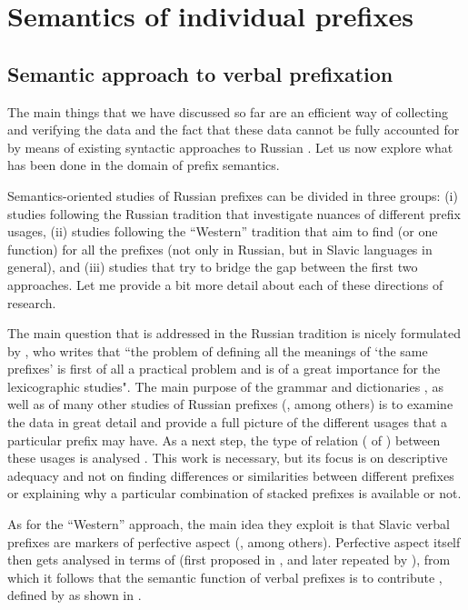 \chapter{Semantics of individual prefixes} %
\label{Chapter5}
\section{Semantic approach to verbal prefixation}
The main things that we have discussed so far are an efficient way of collecting and verifying the data and the fact that these data cannot be fully accounted for by means of existing syntactic approaches to Russian . Let us now explore what has been done in the domain of prefix semantics.

Semantics-oriented studies of Russian prefixes can be divided in three groups: (i) studies following the Russian tradition that investigate nuances of different prefix usages, (ii) studies following the ``Western'' tradition that aim to find  (or one function) for all the prefixes (not only in Russian, but in Slavic languages in general), and (iii) studies that try to bridge the gap between the first two approaches. Let me provide a bit more detail about each of these directions of research.

The main question that is addressed in the Russian tradition is nicely formulated by \citet[18]{Boguslawski:63}, who writes that ``the problem of defining all the meanings of `the same prefixes' is first of all a practical problem and is of a great importance for the lexicographic studies". The main purpose of the grammar \citep{Grammar:52, Shvedova:82} and dictionaries \citep{Dict:50, Dict:57}, as well as of many other studies of Russian prefixes (\citealt{Avilova:64, Golovin:59, Lopatin:97, Tixonov:98}, among others) is to examine the data in great detail and provide a full picture of the different usages that a particular prefix may have. As a next step, the type of relation ( of ) between these usages is analysed \citep{Krongauz:97, Plungyan:01}. This work is necessary, but its focus is on descriptive adequacy and not on finding differences or similarities between different prefixes or explaining why a particular combination of stacked prefixes is available or not.

As for the ``Western'' approach, the main idea they exploit is that Slavic verbal prefixes are markers of perfective aspect (\citealt[see, e.g.,][]{Binnick:91, Krifka:92, Zucchi:99}, among others). Perfective aspect itself then gets analysed in terms of  (first proposed in \citealt{Krifka:86, Krifka:92}, and later repeated by \citealt{Pinon:95}), from which it follows that the semantic function of verbal prefixes is to contribute , defined by \citet{Krifka:86} as shown in . 

